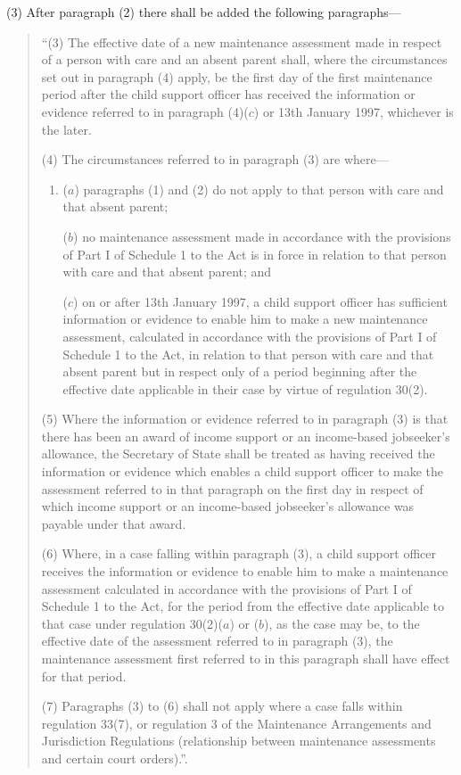 \documentclass[a4paper]{article}
\begin{document}
(3) After paragraph (2) there shall be added the following paragraphs—
\begin{quotation}
“(3) The effective date of a new maintenance assessment made in respect of a person with care and an absent parent shall, where the circumstances set out in paragraph (4) apply, be the first day of the first maintenance period after the child support officer has received the information or evidence referred to in paragraph (4)($c$) or 13th January 1997, whichever is the later.

(4) The circumstances referred to in paragraph (3) are where—
\begin{enumerate}\item[]
($a$) paragraphs (1) and (2) do not apply to that person with care and that absent parent;

($b$) no maintenance assessment made in accordance with the provisions of Part I of Schedule 1 to the Act is in force in relation to that person with care and that absent parent; and

($c$) on or after 13th January 1997, a child support officer has sufficient information or evidence to enable him to make a new maintenance assessment, calculated in accordance with the provisions of Part I of Schedule 1 to the Act, in relation to that person with care and that absent parent but in respect only of a period beginning after the effective date applicable in their case by virtue of regulation 30(2).
\end{enumerate}

(5) Where the information or evidence referred to in paragraph (3) is that there has been an award of income support or an income-based jobseeker’s allowance, the Secretary of State shall be treated as having received the information or evidence which enables a child support officer to make the assessment referred to in that paragraph on the first day in respect of which income support or an income-based jobseeker’s allowance was payable under that award.

(6) Where, in a case falling within paragraph (3), a child support officer receives the information or evidence to enable him to make a maintenance assessment calculated in accordance with the provisions of Part I of Schedule 1 to the Act, for the period from the effective date applicable to that case under regulation 30(2)($a$) or ($b$), as the case may be, to the effective date of the assessment referred to in paragraph (3), the maintenance assessment first referred to in this paragraph shall have effect for that period.

(7) Paragraphs (3) to (6) shall not apply where a case falls within regulation 33(7), or regulation 3 of the Maintenance Arrangements and Jurisdiction Regulations (relationship between maintenance assessments and certain court orders).”.
\end{quotation}
\end{document}
